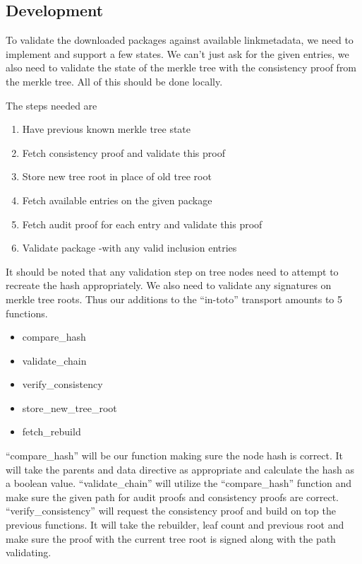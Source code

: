 \documentclass[../Main/thesis.tex]{subfiles}
\begin{document}
\subsection*{Development}%
\label{sub:apt_transport_development}
To validate the downloaded packages against available linkmetadata, we need to
implement and support a few states. We can't just ask for the given entries, we
also need to validate the state of the merkle tree with the consistency proof
from the merkle tree. All of this should be done locally.

The steps needed are
\begin{enumerate}
    \item Have previous known merkle tree state
    \item Fetch consistency proof and validate this proof
    \item Store new tree root in place of old tree root
    \item Fetch available entries on the given package
    \item Fetch audit proof for each entry and validate this proof
    \item Validate package -with any valid inclusion entries
\end{enumerate}

It should be noted that any validation step on tree nodes need to attempt to
recreate the hash appropriately. We also need to validate any signatures on
merkle tree roots. Thus our additions to the ``in-toto'' transport amounts to 5
functions.

\begin{itemize}
    \item compare\_hash
    \item validate\_chain
    \item verify\_consistency
    \item store\_new\_tree\_root
    \item fetch\_rebuild
\end{itemize}

``compare\_hash'' will be our function making sure the node hash is correct. It
will take the parents and data directive as appropriate and calculate the hash
as a boolean value.  ``validate\_chain'' will utilize the ``compare\_hash''
function and make sure the given path for audit proofs and consistency proofs
are correct.  ``verify\_consistency'' will request the consistency proof and
build on top the previous functions. It will take the rebuilder, leaf count and
previous root and make sure the proof with the current tree root is signed along
with the path validating.
\end{document}
